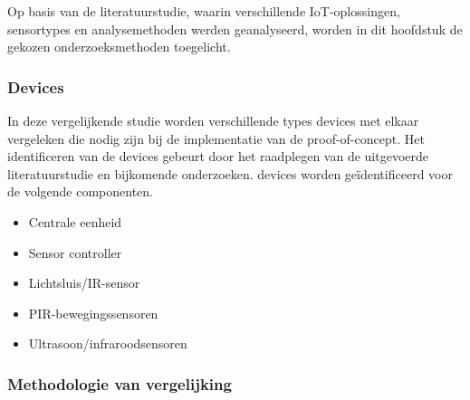 



Op basis van de literatuurstudie, waarin verschillende IoT-oplossingen, sensortypes en analysemethoden werden geanalyseerd, worden in dit hoofdstuk de gekozen onderzoeksmethoden toegelicht.


\subsubsection{Devices}
In deze vergelijkende studie worden verschillende types devices met elkaar vergeleken die nodig zijn bij de implementatie van de proof-of-concept. Het identificeren van de devices gebeurt door het raadplegen van de uitgevoerde literatuurstudie en bijkomende onderzoeken. devices worden geïdentificeerd voor de volgende componenten.

\begin{itemize}
    \item Centrale eenheid
    \item Sensor controller
    \item Lichtsluis/IR-sensor
    \item PIR-bewegingssensoren
    \item Ultrasoon/infraroodsensoren
\end{itemize}


\subsubsection{Methodologie van vergelijking}

